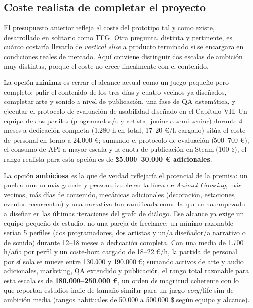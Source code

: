 \documentclass[12pt,twoside,titlepage]{report}
\begin{document}
\subsection{Coste realista de completar el proyecto}

El presupuesto anterior refleja el coste del prototipo tal y como existe, desarrollado en solitario como TFG. Otra pregunta, distinta y pertinente, es cuánto costaría llevarlo de \textit{vertical slice} a producto terminado si se encargara en condiciones reales de mercado. Aquí conviene distinguir dos escalas de ambición muy distintas, porque el coste no crece linealmente con el contenido.

La opción \textbf{mínima} es cerrar el alcance actual como un juego pequeño pero completo: pulir el contenido de los tres días y cuatro vecinos ya diseñados, completar arte y sonido a nivel de publicación, una fase de QA sistemática, y ejecutar el protocolo de evaluación de usabilidad diseñado en el Capítulo VII. Un equipo de dos perfiles (programador/a y artista, junior o semi-senior) durante 4 meses a dedicación completa (1.280 h en total, 17--20 €/h cargado) sitúa el coste de personal en torno a 24.000 €; sumando el protocolo de evaluación (500--700 €), el consumo de API a mayor escala y la cuota de publicación en Steam (100 \$), el rango realista para esta opción es de \textbf{25.000--30.000 € adicionales}.

La opción \textbf{ambiciosa} es la que de verdad reflejaría el potencial de la premisa: un pueblo mucho más grande y personalizable en la línea de \textit{Animal Crossing}, más vecinos, más días de contenido, mecánicas adicionales (decoración, estaciones, eventos recurrentes) y una narrativa tan ramificada como la que se ha empezado a diseñar en las últimas iteraciones del grafo de diálogo. Ese alcance ya exige un equipo pequeño de estudio, no una pareja de freelance: un mínimo razonable serían 5 perfiles (dos programadores, dos artistas y un/a diseñador/a narrativo o de sonido) durante 12--18 meses a dedicación completa. Con una media de 1.700 h/año por perfil y un coste-hora cargado de 18--22 €/h, la partida de personal por sí sola se mueve entre 130.000 y 190.000 €; sumando activos de arte y audio adicionales, marketing, QA extendido y publicación, el rango total razonable para esta escala es de \textbf{180.000--250.000 €}, un orden de magnitud coherente con lo que reportan estudios indie de tamaño similar para un juego \textit{cozy}/life-sim de ambición media (rangos habituales de 50.000 a 500.000 \$ según equipo y alcance).
\end{document}

